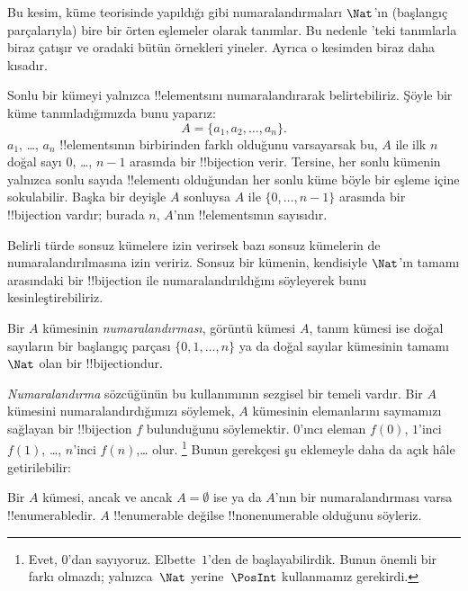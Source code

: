 \documentclass[../../../include/open-logic-section]{subfiles}
\begin{document}


\begin{editorial}
  Bu kesim, küme teorisinde yapıldığı gibi numaralandırmaları $\Nat$'ın
  (başlangıç parçalarıyla) bire bir örten eşlemeler olarak tanımlar. Bu
  nedenle 'teki tanımlarla biraz çatışır ve oradaki bütün
  örnekleri yineler. Ayrıca o kesimden biraz daha kısadır.
\end{editorial}

Sonlu bir kümeyi yalnızca !!{element}s{}ını numaralandırarak belirtebiliriz.
Şöyle bir küme tanımladığımızda bunu yaparız:
\[
  A = \{a_1, a_2, \ldots, a_n\}.
\]
$a_1$, \dots, $a_n$ !!{element}s{}ının birbirinden farklı olduğunu
varsayarsak bu, $A$ ile ilk $n$ doğal sayı $0$, \dots, $n-1$ arasında bir
!!{bijection} verir. Tersine, her sonlu kümenin yalnızca sonlu sayıda
!!{element}{}ı olduğundan her sonlu küme böyle bir eşleme içine sokulabilir.
Başka bir deyişle $A$ sonluysa $A$ ile $\{0,\dots,n-1\}$ arasında bir
!!{bijection} vardır; burada $n$, $A$'nın !!{element}s{}ının sayısıdır.

Belirli türde sonsuz kümelere izin verirsek bazı sonsuz kümelerin de
numaralandırılmasına izin veririz. Sonsuz bir kümenin, kendisiyle $\Nat$'ın
tamamı arasındaki bir !!{bijection} ile numaralandırıldığını söyleyerek bunu
kesinleştirebiliriz.

\begin{defn}
Bir $A$ kümesinin \emph{numaralandırması}, görüntü kümesi $A$, tanım kümesi
  ise doğal sayıların bir başlangıç parçası $\{0,1,\ldots,n\}$ ya da doğal
sayılar kümesinin tamamı $\Nat$ olan bir !!{bijection}{}dur.
\end{defn}

\begin{explain}
\emph{Numaralandırma} sözcüğünün bu kullanımının sezgisel bir temeli vardır.
Bir $A$ kümesini numaralandırdığımızı söylemek, $A$ kümesinin elemanlarını
saymamızı sağlayan bir !!{bijection} $f$ bulunduğunu söylemektir. $0$'ıncı
eleman $f(0)$, $1$'inci $f(1)$, \ldots, $n$'inci $f(n)$,\ldots{} olur.
\footnote{Evet, $0$'dan sayıyoruz. Elbette~$1$'den de başlayabilirdik. Bunun
önemli bir farkı olmazdı; yalnızca~$\Nat$ yerine~$\PosInt$ kullanmamız
gerekirdi.} Bunun gerekçesi şu eklemeyle daha da açık hâle getirilebilir:
\end{explain}

\begin{defn}
  Bir $A$ kümesi, ancak ve ancak $A=\emptyset$ ise ya da $A$'nın bir
  numaralandırması varsa !!{enumerable}{}dir. $A$ !!{enumerable} değilse
  !!{nonenumerable} olduğunu söyleriz.
\end{defn}
\end{document}

